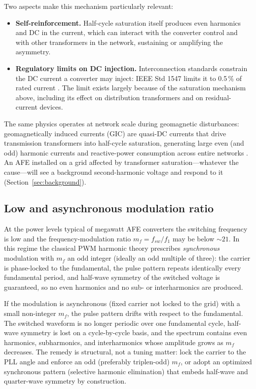 \documentclass[11pt,a4paper]{article}
\begin{document}
Two aspects make this mechanism particularly relevant:
%
\begin{itemize}
\item \textbf{Self-reinforcement.} Half-cycle saturation itself produces even
harmonics and DC in the current, which can interact with the converter control
and with other transformers in the network, sustaining or amplifying the
asymmetry.
\item \textbf{Regulatory limits on DC injection.} Interconnection standards
constrain the DC current a converter may inject: IEEE Std 1547 limits it to
0.5\,\% of rated current \cite{ieee1547}. The limit exists largely because of
the saturation mechanism above, including its effect on distribution
transformers and on residual-current devices.
\end{itemize}
%
The same physics operates at network scale during geomagnetic disturbances:
geomagnetically induced currents (GIC) are quasi-DC currents that drive
transmission transformers into half-cycle saturation, generating large even
(and odd) harmonic currents and reactive-power consumption across entire
networks \cite{pirjola}. An AFE installed on a grid affected by transformer
saturation---whatever the cause---will see a background second-harmonic voltage
and respond to it (Section~\ref{sec:background}).

\subsection{Low and asynchronous modulation ratio}

At the power levels typical of megawatt AFE converters the switching frequency
is low and the frequency-modulation ratio $m_f = f_{sw}/f_1$ may be below
$\sim 21$. In this regime the classical PWM harmonic theory \cite{holmes}
prescribes \emph{synchronous} modulation with $m_f$ an odd integer (ideally an
odd multiple of three): the carrier is phase-locked to the fundamental, the
pulse pattern repeats identically every fundamental period, and half-wave
symmetry of the switched voltage is guaranteed, so no even harmonics and no
sub- or interharmonics are produced.

If the modulation is asynchronous (fixed carrier not locked to the grid) with a
small non-integer $m_f$, the pulse pattern drifts with respect to the
fundamental. The switched waveform is no longer periodic over one fundamental
cycle, half-wave symmetry is lost on a cycle-by-cycle basis, and the spectrum
contains even harmonics, subharmonics, and interharmonics whose amplitude grows
as $m_f$ decreases. The remedy is structural, not a tuning matter: lock the
carrier to the PLL angle and enforce an odd (preferably triplen-odd) $m_f$, or
adopt an optimized synchronous pattern (selective harmonic elimination) that
embeds half-wave and quarter-wave symmetry by construction.
\end{document}
